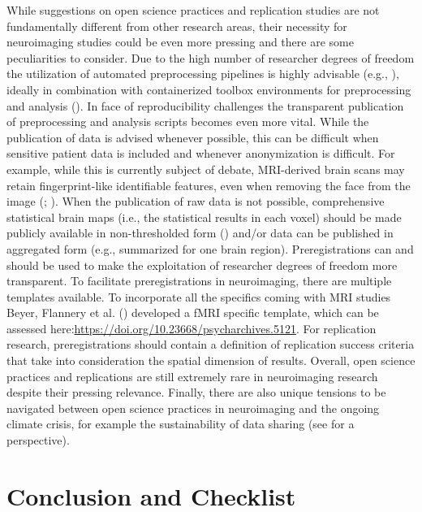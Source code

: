 \documentclass[
  letterpaper,
  DIV=11,
  openany,
  fontsize=12pt,
  parskip=half,
  headings=big,
  numbers=noenddot,
  titlepage=false]{scrreprt}
\begin{document}
While suggestions on open science practices and replication studies are
not fundamentally different from other research areas, their necessity
for neuroimaging studies could be even more pressing and there are some
peculiarities to consider. Due to the high number of researcher degrees
of freedom the utilization of automated preprocessing pipelines is
highly advisable (e.g., ), ideally in combination with containerized toolbox environments
for preprocessing and analysis (). In face of reproducibility challenges the transparent
publication of preprocessing and analysis scripts becomes even more
vital. While the publication of data is advised whenever possible, this
can be difficult when sensitive patient data is included and whenever
anonymization is difficult. For example, while this is currently subject
of debate, MRI-derived brain scans may retain fingerprint-like
identifiable features, even when removing the face from the image
(;
). When the
publication of raw data is not possible, comprehensive statistical brain
maps (i.e., the statistical results in each voxel) should be made
publicly available in non-thresholded form
() and/or data can be
published in aggregated form (e.g., summarized for one brain region).
Preregistrations can and should be used to make the exploitation of
researcher degrees of freedom more transparent. To facilitate
preregistrations in neuroimaging, there are multiple templates
available. To incorporate all the specifics coming with MRI studies
Beyer, Flannery et al. () developed a
fMRI specific template, which can be assessed
here:\href{https://doi.org/10.23668/psycharchives.5121}{}\url{https://doi.org/10.23668/psycharchives.5121}.
For replication research, preregistrations should contain a definition
of replication success criteria that take into consideration the spatial
dimension of results. Overall, open science practices and replications
are still extremely rare in neuroimaging research despite their pressing
relevance. Finally, there are also unique tensions to be navigated
between open science practices in neuroimaging and the ongoing climate
crisis, for example the sustainability of data sharing (see
 for a
perspective).

\part{Conclusion and Checklist}
\end{document}
